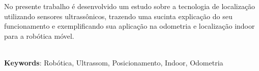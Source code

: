 \begin{thesisresumo}
No presente trabalho é desenvolvido um estudo sobre a tecnologia de localização utilizando sensores ultrassônicos, trazendo uma sucinta explicação do seu funcionamento e exemplificando sua aplicação na odometria e localização indoor para a robótica móvel.

\ \\
\textbf{Keywords}: Robótica, Ultrassom, Posicionamento, Indoor, Odometria
\end{thesisresumo}
